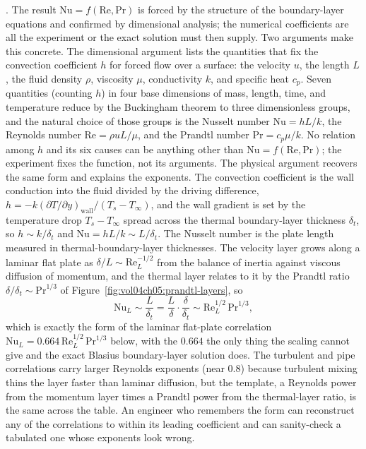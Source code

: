 

. The result
$\text{Nu} = f(\text{Re}, \text{Pr})$ is forced by the structure of the
boundary-layer equations and confirmed by dimensional analysis; the numerical
coefficients are all the experiment or the exact solution must then supply. Two
arguments make this concrete. The dimensional argument lists the quantities that
fix the convection coefficient $h$ for forced flow over a surface: the velocity
$u$, the length $L$, the fluid density $\rho$, viscosity $\mu$, conductivity
$k$, and specific heat $c_p$. Seven quantities (counting $h$) in four base
dimensions of mass, length, time, and temperature reduce by the Buckingham
theorem to three dimensionless groups, and the natural choice of those groups is
the Nusselt number $\text{Nu} = hL/k$, the Reynolds number
$\text{Re} = \rho u L/\mu$, and the Prandtl number $\text{Pr} = c_p\mu/k$. No
relation among $h$ and its six causes can be anything other than
$\text{Nu} = f(\text{Re},\text{Pr})$; the experiment fixes the function, not its
arguments. The physical argument recovers the same form and explains the
exponents. The convection coefficient is the wall conduction into the fluid
divided by the driving difference, $h = -k(\partial T/\partial y)_{\text{wall}}/
(T_s - T_\infty)$, and the wall gradient is set by the temperature drop
$T_s - T_\infty$ spread across the thermal boundary-layer thickness $\delta_t$,
so $h \sim k/\delta_t$ and $\text{Nu} = hL/k \sim L/\delta_t$. The Nusselt
number is the plate length measured in thermal-boundary-layer thicknesses. The
velocity layer grows along a laminar flat plate as $\delta/L \sim
\text{Re}_L^{-1/2}$ from the balance of inertia against viscous diffusion of
momentum, and the thermal layer relates to it by the Prandtl ratio
$\delta/\delta_t \sim \text{Pr}^{1/3}$ of
Figure~\ref{fig:vol04ch05:prandtl-layers}, so
\[
\text{Nu}_L \sim \frac{L}{\delta_t} = \frac{L}{\delta}\cdot
\frac{\delta}{\delta_t} \sim \text{Re}_L^{1/2}\,\text{Pr}^{1/3},
\]
which is exactly the form of the laminar flat-plate correlation
$\text{Nu}_L = 0.664\,\text{Re}_L^{1/2}\,\text{Pr}^{1/3}$ below, with the
$0.664$ the only thing the scaling cannot give and the exact Blasius
boundary-layer solution does. The turbulent and pipe correlations carry larger
Reynolds exponents (near $0.8$) because turbulent mixing thins the layer faster
than laminar diffusion, but the template, a Reynolds power from the momentum
layer times a Prandtl power from the thermal-layer ratio, is the same across the
table. An engineer who remembers the form can reconstruct any of the
correlations to within its leading coefficient and can sanity-check a tabulated
one whose exponents look wrong.

